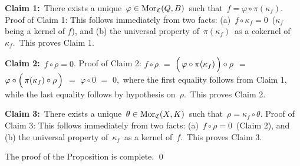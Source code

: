\vskip 0.3cm
\noindent
\textbf{Claim 1:}\;\, There exists a unique \,$\varphi \in \textnormal{Mor}_{\mathfrak{C}}(Q,B)$\,
such that \,$f = \varphi \circ \pi(\kappa_{f})$.
\vskip 0.1cm
\noindent
Proof of Claim 1:\; This follows immediately from two facts:
(a) \,$f \circ \kappa_{f} = 0$\, ($\kappa_{f}$ being a kernel of $f$), and
(b) the universal property of \,$\pi(\kappa_{f})$\, as a cokernel of \,$\kappa_{f}$.\,
This proves Claim 1.

\vskip 0.3cm
\noindent
\textbf{Claim 2:}\;\, $f \circ \rho = 0$.
\vskip 0.05cm
\noindent
Proof of Claim 2:\;
$f \circ \rho$
\;$=$\; $\left(\,\varphi \overset{{\color{white}1}}{\circ} \pi(\kappa_{f})\,\right) \circ \rho$
\;$=$\; $\varphi \circ \left(\, \pi(\kappa_{f}) \overset{{\color{white}1}}{\circ} \rho\,\right)$
\;$=$\; $\varphi \circ 0$
\;$=$\; $0$,\,
where the first equality follows from Claim 1, while the last equality follows by hypothesis on \,$\rho$.\,
This proves Claim 2.

\vskip 0.3cm
\noindent
\textbf{Claim 3:}\;\, There exists a unique \,$\theta \in \textnormal{Mor}_{\mathfrak{C}}(X,K)$\,
such that \,$\rho = \kappa_{f} \circ \theta$.
\vskip 0.1cm
\noindent
Proof of Claim 3:\; This follows immediately from two facts:
(a) \,$f \circ \rho = 0$\, (Claim 2),
and (b) the universal property of \,$\kappa_{f}$\, as a kernel of \,$f$.\,
This proves Claim 3.

\vskip 0.3cm
\noindent
The proof of the Proposition is complete.
\qed


